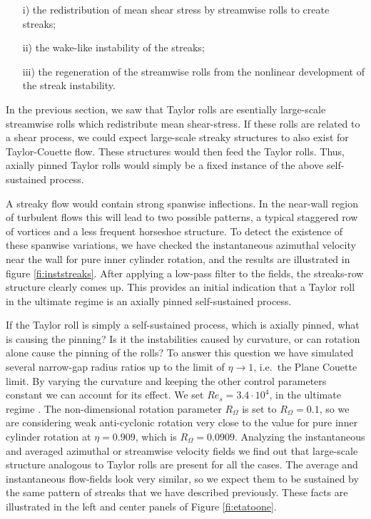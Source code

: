 \documentclass{jfm}
\begin{document}
\begin{itemize}
\item[i)] the redistribution of mean shear stress by streamwise rolls to create streaks;
\item[ii)] the wake-like instability of the streaks;
\item[iii)] the regeneration of the streamwise rolls from the nonlinear development of the streak instability.
\end{itemize}

In the previous section, we saw that Taylor rolls are esentially large-scale streamwise rolls which redistribute mean shear-stress. If these rolls are related to a shear process, we could expect large-scale streaky structures to also exist for Taylor-Couette flow. These structures would then feed the Taylor rolls. Thus, axially pinned Taylor rolls would simply be a fixed instance of the above self-sustained process. 

A streaky flow would contain strong spanwise inflections. In the near-wall region of turbulent flows this will lead to two possible patterns, a typical staggered row of vortices and a less frequent horseshoe structure. To detect the existence of these spanwise variations, we have checked the instantaneous azimuthal velocity near the wall for pure inner cylinder rotation, and the results are illustrated in figure \ref{fi:inststreaks}. After applying a low-pass filter to the fields, the streaks-row structure clearly comes up. This provides an initial indication that a Taylor roll in the ultimate regime is an axially pinned self-sustained process.


If the Taylor roll is simply a self-sustained process, which is axially pinned, what is causing the pinning? Is it the instabilities caused by curvature, or can rotation alone cause the pinning of the rolls? To answer this question we have simulated several narrow-gap radius ratios up to the limit of $\eta \to 1$, i.e.~the Plane Couette limit. By varying the curvature and keeping the other control parameters constant we can account for its effect. We set $Re_s=3.4\cdot 10^4$, in the ultimate regime \citep{ost14}. The non-dimensional rotation parameter $R_\Omega$ is set to $R_\Omega=0.1$, so we are considering weak anti-cyclonic rotation very close to the value for pure inner cylinder rotation at $\eta=0.909$, which is $R_\Omega=0.0909$. Analyzing the instantaneous and averaged azimuthal or streamwise velocity fields we find out that large-scale structure analogous to Taylor rolls are present for all the cases. The average and instantaneous flow-fields look very similar, so we expect them to be sustained by the same pattern of streaks that we have described previously. These facts are illustrated in the left and center panels of Figure \ref{fi:etatoone}. 
\end{document}
